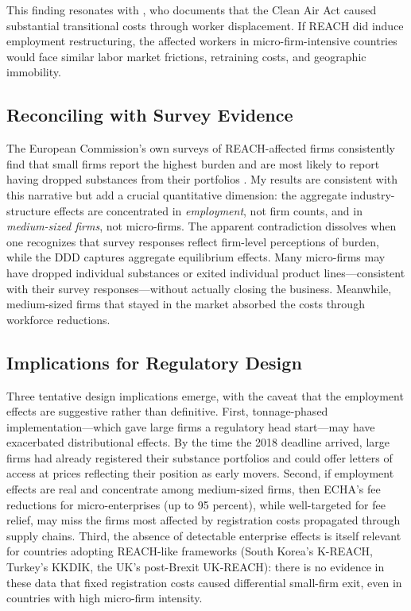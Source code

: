 \documentclass[12pt]{article}
\begin{document}
This finding resonates with \citet{walker2013}, who documents that the Clean Air Act caused substantial transitional costs through worker displacement. If REACH did induce employment restructuring, the affected workers in micro-firm-intensive countries would face similar labor market frictions, retraining costs, and geographic immobility.

\subsection{Reconciling with Survey Evidence}

The European Commission's own surveys of REACH-affected firms consistently find that small firms report the highest burden and are most likely to report having dropped substances from their portfolios \citep{ec2018impact, milieu2015}. My results are consistent with this narrative but add a crucial quantitative dimension: the aggregate industry-structure effects are concentrated in \textit{employment}, not firm counts, and in \textit{medium-sized firms}, not micro-firms. The apparent contradiction dissolves when one recognizes that survey responses reflect firm-level perceptions of burden, while the DDD captures aggregate equilibrium effects. Many micro-firms may have dropped individual substances or exited individual product lines---consistent with their survey responses---without actually closing the business. Meanwhile, medium-sized firms that stayed in the market absorbed the costs through workforce reductions.

\subsection{Implications for Regulatory Design}

Three tentative design implications emerge, with the caveat that the employment effects are suggestive rather than definitive. First, tonnage-phased implementation---which gave large firms a regulatory head start---may have exacerbated distributional effects. By the time the 2018 deadline arrived, large firms had already registered their substance portfolios and could offer letters of access at prices reflecting their position as early movers. Second, if employment effects are real and concentrate among medium-sized firms, then ECHA's fee reductions for micro-enterprises (up to 95 percent), while well-targeted for fee relief, may miss the firms most affected by registration costs propagated through supply chains. Third, the absence of detectable enterprise effects is itself relevant for countries adopting REACH-like frameworks (South Korea's K-REACH, Turkey's KKDIK, the UK's post-Brexit UK-REACH): there is no evidence in these data that fixed registration costs caused differential small-firm exit, even in countries with high micro-firm intensity.
\end{document}

